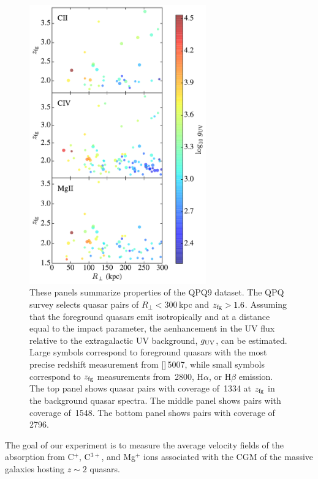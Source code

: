 \documentclass[iop]{emulateapj}
\begin{document}
\begin{figure}
\includegraphics[width=3in]{Figures/fig_experiment.pdf}
\caption{These panels summarize properties of the QPQ9 dataset. The QPQ survey selects 
quasar pairs of $R_\perp < 300$\,kpc and $z_{\rm fg}>1.6$. Assuming that the foreground quasars 
emit isotropically and at a distance equal to the impact parameter, the aenhancement in the UV 
flux relative to the extragalactic UV background, $g_{\rm UV}$, can be estimated. Large 
symbols correspond to foreground quasars with the most precise redshift measurement from 
[]\,5007, while small symbols correspond to $z_{\rm fg}$ 
measurements from \,2800, H$\alpha$, or H$\beta$ emission. The top panel shows 
quasar pairs with coverage of \,1334 at $z_{\rm fg}$ in the background quasar spectra. 
The middle panel shows pairs with coverage of \,1548. The bottom panel shows 
pairs with coverage of \,2796. 
}
\label{fig:experiment}
\end{figure}

The goal of our experiment is to measure the average velocity fields of the absorption from C$^+$, 
C$^{3+}$, and Mg$^+$ ions associated with the CGM of the massive galaxies hosting $z\sim 2$ 
quasars. 
\end{document}
